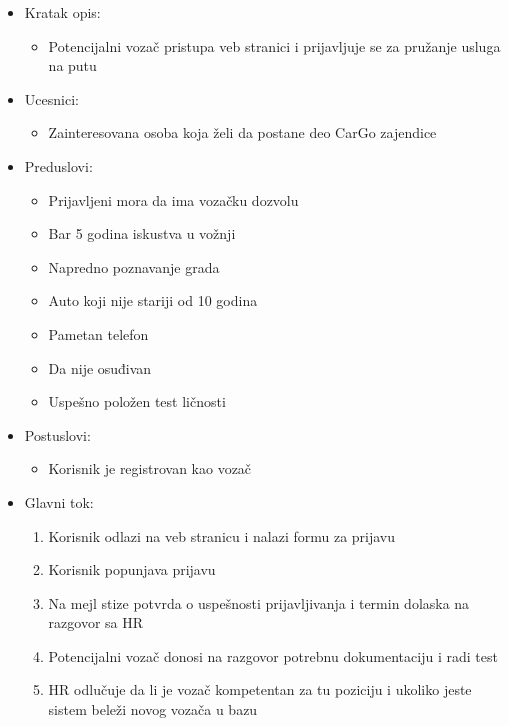 \begin{itemize}
	\item Kratak opis:
		\begin{itemize}
			\item Potencijalni vozač pristupa veb stranici i prijavljuje se za pružanje usluga na putu
		\end{itemize}
 
	\item Ucesnici:
		\begin{itemize}
			\item Zainteresovana osoba koja želi da postane deo CarGo zajendice		
		\end{itemize}				

	\item Preduslovi:
		\begin{itemize}
		    \item Prijavljeni mora da ima vozačku dozvolu
		    \item Bar 5 godina iskustva u vožnji
		    \item Napredno poznavanje grada
		    \item Auto koji nije stariji od 10 godina
		    \item Pametan telefon
		    \item Da nije osuđivan
		    \item Uspešno položen test ličnosti
		\end{itemize}

	\item Postuslovi:
		\begin{itemize}
			\item Korisnik je registrovan kao vozač
		\end{itemize}		


	\item Glavni tok:
		\begin{enumerate}
		    \item Korisnik odlazi na veb stranicu i nalazi formu za prijavu
		    \item Korisnik popunjava prijavu
		    \item Na mejl stize potvrda o uspešnosti prijavljivanja i termin dolaska na razgovor sa HR
		    \item Potencijalni vozač donosi na razgovor potrebnu dokumentaciju i radi test
		    \item HR odlučuje da li je vozač kompetentan za tu poziciju i ukoliko jeste sistem beleži novog vozača u bazu
		\end{enumerate}


\end{itemize}
